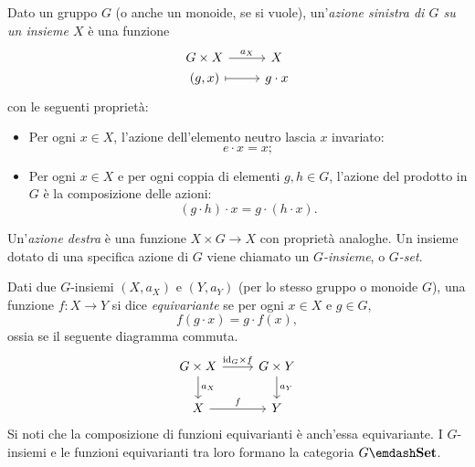 \begin{example}\label{ex_cat_g_insiemi}
	Dato un gruppo \(G\) (o anche un monoide, se si vuole), un'\emph{azione sinistra di \(G\) su un insieme \(X\)} è una funzione 
	\[
	\begin{tikzcd}[row sep=0]
		G\times X \ar{r}{a_X} & X \\
		(g,x) \ar[mapsto]{r} & g\cdot x
	\end{tikzcd}
	\]
	con le seguenti proprietà:
	\begin{itemize}
		\item Per ogni \(x\in X\), l'azione dell'elemento neutro lascia \(x\) invariato:
		\[
		e\cdot x = x ;
		\]
		\item Per ogni \(x\in X\) e per ogni coppia di elementi \(g,h\in G\), l'azione del prodotto in \(G\) è la composizione delle azioni:
		\[
		(g\cdot h)\cdot x = g\cdot(h\cdot x) .
		\]
	\end{itemize}
	Un'\emph{azione destra} è una funzione \(X\times G\to X\) con proprietà analoghe.
	Un insieme dotato di una specifica azione di \(G\) viene chiamato un \emph{\(G\)-insieme}, o \emph{\(G\)-set}.
	
	Dati due \(G\)-insiemi \((X,a_X)\) e \((Y,a_Y)\) (per lo stesso gruppo o monoide \(G\)), una funzione \(f:X\to Y\) si dice \emph{equivariante} se per ogni \(x\in X\) e \(g\in G\),
	\[
		f(g\cdot x) = g\cdot f(x) ,
	\]
	ossia se il seguente diagramma commuta.
	\[
	\begin{tikzcd}
		G\times X \ar{r}{\id_G\times f} \ar{d}{a_X} & G\times Y \ar{d}{a_Y} \\
		X \ar{r}{f} & Y
	\end{tikzcd}
	\]
	Si noti che la composizione di funzioni equivarianti è anch'essa equivariante. I \(G\)-insiemi e le funzioni equivarianti tra loro formano la categoria \(G\emdash\ctSet\). 
\end{example}
